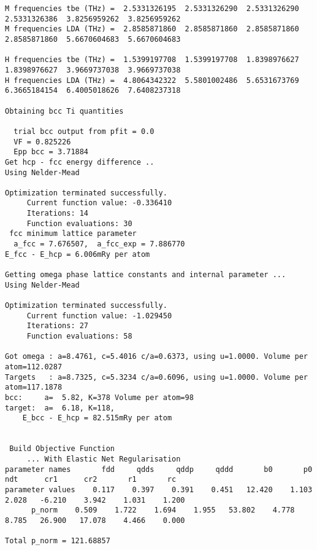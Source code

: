 \documentclass[11pt]{article}
\begin{document}
\begin{verbatim}
M frequencies tbe (THz) =  2.5331326195  2.5331326290  2.5331326290  2.5331326386  3.8256959262  3.8256959262 
M frequencies LDA (THz) =  2.8585871860  2.8585871860  2.8585871860  2.8585871860  5.6670604683  5.6670604683 

H frequencies tbe (THz) =  1.5399197708  1.5399197708  1.8398976627  1.8398976627  3.9669737038  3.9669737038 
H frequencies LDA (THz) =  4.8064342322  5.5801002486  5.6531673769  6.3665184154  6.4005018626  7.6408237318 

Obtaining bcc Ti quantities

  trial bcc output from pfit = 0.0
  VF = 0.825226
  Epp bcc = 3.71884
Get hcp - fcc energy difference ..
Using Nelder-Mead

Optimization terminated successfully.
	 Current function value: -0.336410
	 Iterations: 14
	 Function evaluations: 30
 fcc minimum lattice parameter
  a_fcc = 7.676507,  a_fcc_exp = 7.886770 
E_fcc - E_hcp = 6.006mRy per atom 

Getting omega phase lattice constants and internal parameter ...
Using Nelder-Mead

Optimization terminated successfully.
	 Current function value: -1.029450
	 Iterations: 27
	 Function evaluations: 58

Got omega : a=8.4761, c=5.4016 c/a=0.6373, using u=1.0000. Volume per atom=112.0287
Targets   : a=8.7325, c=5.3234 c/a=0.6096, using u=1.0000. Volume per atom=117.1878
bcc:     a=  5.82, K=378 Volume per atom=98
target:  a=  6.18, K=118,                     
	E_bcc - E_hcp = 82.515mRy per atom 


 Build Objective Function
     ... With Elastic Net Regularisation
parameter names       fdd     qdds     qddp     qddd       b0       p0      ndt      cr1      cr2       r1       rc 
parameter values    0.117    0.397    0.391    0.451   12.420    1.103    2.028   -6.210    3.942    1.031    1.200 
	  p_norm    0.509    1.722    1.694    1.955   53.802    4.778    8.785   26.900   17.078    4.466    0.000 

Total p_norm = 121.68857



\end{verbatim}
\end{document}
